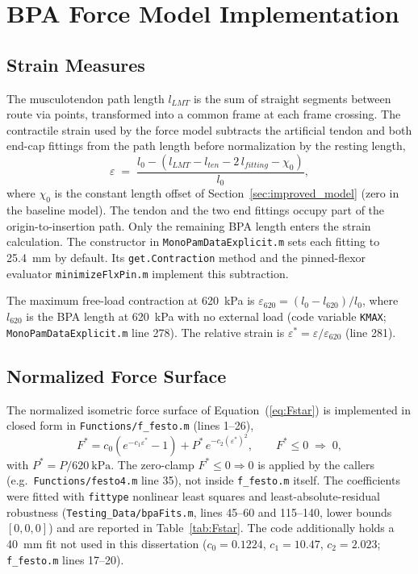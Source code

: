 \section{BPA Force Model Implementation}

\subsection{Strain Measures}
The musculotendon path length $l_{LMT}$ is the sum of straight segments between route via points, transformed into a common frame at each frame crossing. The contractile strain used by the force model subtracts the artificial tendon and both end-cap fittings from the path length before normalization by the resting length,
\begin{equation}
    \varepsilon \;=\; \frac{l_{0} - \left(l_{LMT} - l_{ten} - 2\,l_{fitting} - \chi_{0}\right)}{l_{0}},
    \label{eq:app_strain}
\end{equation}
where $\chi_{0}$ is the constant length offset of Section~\ref{sec:improved_model} (zero in the baseline model). The tendon and the two end fittings occupy part of the origin-to-insertion path. Only the remaining BPA length enters the strain calculation. The constructor in \nolinkurl{MonoPamDataExplicit.m} sets each fitting to \qty{25.4}{\mm} by default. Its \texttt{get.Contraction} method and the pinned-flexor evaluator \nolinkurl{minimizeFlxPin.m} implement this subtraction.

The maximum free-load contraction at \qty{620}{\kPa} is $\varepsilon_{620} = (l_{0}-l_{620})/l_{0}$, where $l_{620}$ is the BPA length at \qty{620}{\kPa} with no external load (code variable \texttt{KMAX}; \texttt{MonoPamDataExplicit.m} line 278). The relative strain is $\varepsilon^{*} = \varepsilon / \varepsilon_{620}$ (line 281).

\subsection{Normalized Force Surface}
The normalized isometric force surface of Equation~(\ref{eq:Fstar}) is implemented in closed form in \nolinkurl{Functions/f_festo.m} (lines 1--26),
\begin{equation}
    F^{*} = c_{0}\left(e^{-c_{1}\varepsilon^{*}} - 1\right)
            + P^{*}\,e^{-c_{2}(\varepsilon^{*})^{2}},
    \qquad F^{*}\le 0 \;\Rightarrow\; 0,
    \label{eq:app_fstar}
\end{equation}
with $P^{*} = P/\qty{620}{\kPa}$. The zero-clamp $F^{*}\le 0 \Rightarrow 0$ is applied by the callers (e.g.\ \nolinkurl{Functions/festo4.m} line 35), not inside \nolinkurl{f_festo.m} itself. The coefficients were fitted with \texttt{fittype} nonlinear least squares and least-absolute-residual robustness (\nolinkurl{Testing_Data/bpaFits.m}, lines 45--60 and 115--140, lower bounds $[0,0,0]$) and are reported in Table~\ref{tab:Fstar}. The code additionally holds a \qty{40}{\mm} fit not used in this dissertation ($c_0 = 0.1224$, $c_1 = 10.47$, $c_2 = 2.023$; \nolinkurl{f_festo.m} lines 17--20).

